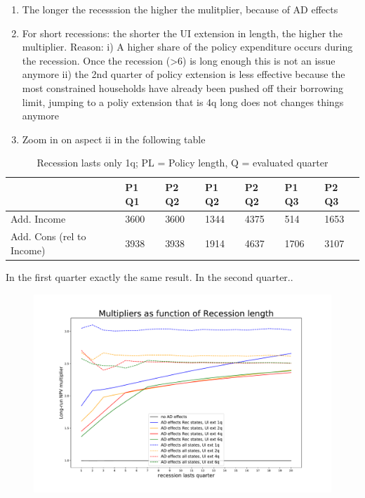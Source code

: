 \documentclass[]{article}
\begin{document}
\begin{enumerate}
	\item The longer the recesssion the higher the mulitplier, because of AD effects
	\item For short recessions: the shorter the UI extension in length, the higher the multiplier. Reason: 
	i) A higher share of the policy expenditure occurs during the recession. Once the recession (>6) is long enough this is not an issue anymore
	ii) the 2nd quarter of policy extension is less effective because the most constrained households have already been pushed off their borrowing limit, jumping to a poliy extension that is 4q long does not changes things anymore
	\item Zoom in on aspect ii in the following table
\end{enumerate}

\begin{table}[htb]
	\centering
	\begin{tabular}{@{}lllllll@{}}
		\toprule
					  				& P1 Q1 & P2 Q2 & P1 Q2 & P2 Q2 &  P1 Q3 & P2 Q3 \\ \midrule
		Add. Income     			& 3600  & 3600  & 1344  & 4375  &  514   & 1653 \\
		Add. Cons (rel to Income)   & 3938  & 3938  & 1914  & 4637  &  1706  & 3107  \\ \bottomrule
	\end{tabular}	
	\caption{Recession lasts only 1q; PL = Policy length, Q = evaluated quarter}
\end{table}

In the first quarter exactly the same result.
In the second quarter..



\begin{figure}[h]
	\centering
	\includegraphics[width=1\linewidth]{../FullRun_Apr18_AD05_AllStates_800k/Multipliers_RecLength_PolicyLength2}
	\caption{}
	\label{fig:multipliersreclengthpolicylength2}
\end{figure}
\end{document}
